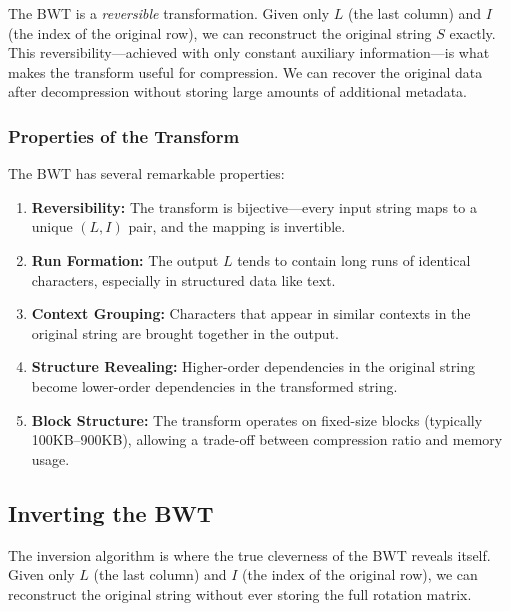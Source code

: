 \begin{importantbox}
The BWT is a \emph{reversible} transformation. Given only \(L\) (the last column) and \(I\) (the index of the original row), we can reconstruct the original string \(S\) exactly. This reversibility—achieved with only constant auxiliary information—is what makes the transform useful for compression. We can recover the original data after decompression without storing large amounts of additional metadata.
\end{importantbox}

\subsubsection{Properties of the Transform}

The BWT has several remarkable properties:

\begin{enumerate}
    \item \textbf{Reversibility:} The transform is bijective—every input string maps to a unique \((L, I)\) pair, and the mapping is invertible.
    
    \item \textbf{Run Formation:} The output \(L\) tends to contain long runs of identical characters, especially in structured data like text.
    
    \item \textbf{Context Grouping:} Characters that appear in similar contexts in the original string are brought together in the output.
    
    \item \textbf{Structure Revealing:} Higher-order dependencies in the original string become lower-order dependencies in the transformed string.
    
    \item \textbf{Block Structure:} The transform operates on fixed-size blocks (typically 100KB–900KB), allowing a trade-off between compression ratio and memory usage.
\end{enumerate}


\subsection{Inverting the BWT}

The inversion algorithm is where the true cleverness of the BWT reveals itself. Given only \(L\) (the last column) and \(I\) (the index of the original row), we can reconstruct the original string without ever storing the full rotation matrix.


